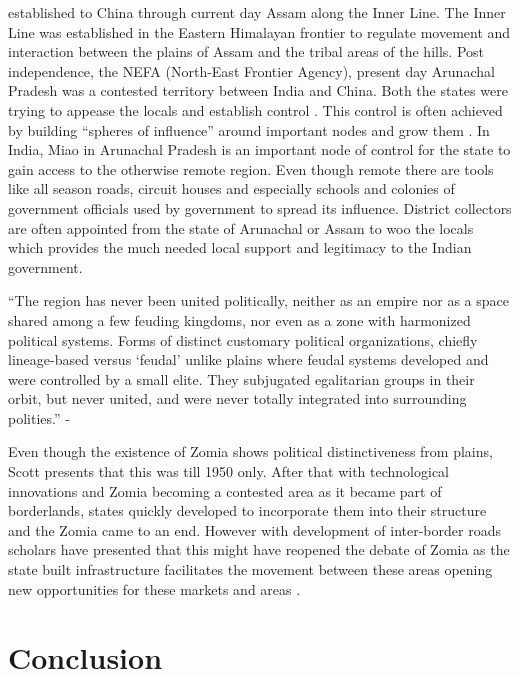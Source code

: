 established to China through current day Assam along the Inner Line. The Inner Line was established in the Eastern Himalayan frontier to regulate movement and interaction between the plains of Assam and the tribal areas of the hills. Post independence, the NEFA (North-East Frontier Agency), present day Arunachal Pradesh was a contested territory between India and China. Both the states were trying to appease the locals and establish control \citep{guyot2017shadow}. This control is often achieved by building \enquote{spheres of influence} around important nodes and grow them \citep{Farrelly_2013b}. In India, Miao in Arunachal Pradesh is an important node of control for the state to gain access to the otherwise remote region. Even though remote there are tools like all season roads, circuit houses and especially schools and colonies of government officials used by government to spread its influence. District collectors are often appointed from the state of Arunachal or Assam to woo the locals which provides the much needed local support and legitimacy to the Indian government.  

\vspace{0.3cm}

 \enquote{The region has never been united politically, neither as an empire nor as a space shared among a few feuding kingdoms, nor even as a zone with harmonized political systems. Forms of distinct customary political organizations, chiefly lineage-based versus \enquote{feudal} unlike plains where feudal systems developed and were controlled by a small elite. They subjugated egalitarian groups in their orbit, but never united, and were never totally integrated into surrounding polities.} - \citep{michaud2017s}

\vspace{0.3cm}

 Even though the existence of Zomia shows political distinctiveness from plains, Scott presents that this was till 1950 only. After that with technological innovations and Zomia becoming a contested area as it became part of borderlands, states quickly developed to incorporate them into their structure and the Zomia came to an end. However with development of inter-border roads scholars have presented that this might have reopened the debate of Zomia as the state built infrastructure facilitates the movement between these areas opening new opportunities for these markets and areas \citep{murton2013himalayan}. 

 \section{Conclusion}

